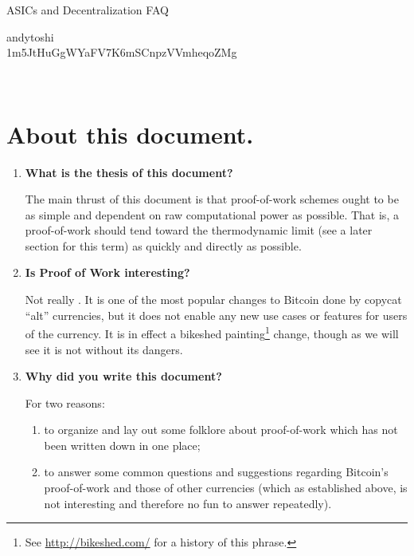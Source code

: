 \documentclass[letterpaper]{article}
\theoremstyle{xxx}
\theoremstyle{evil}
\theoremstyle{yyy}
\theoremstyle{plain}
\theoremstyle{zzz}
\begin{document}
\begin{minipage}[b]{0.7\linewidth}
{\huge ASICs and Decentralization FAQ}
\end{minipage}
\begin{minipage}[b]{0.3\linewidth}
  \begin{flushright}
    andytoshi{\tiny \\
    \tiny 1m5JtHuGgWYaFV7K6mSCnpzVVmheqoZMg}
  \end{flushright}
\end{minipage}
\\

\section{About this document.}
\begin{enumerate}
\item \textbf{What is the thesis of this document?}

The main thrust of this document is that proof-of-work schemes ought
to be as simple and dependent on raw computational power as possible.
That is, a proof-of-work should tend toward the thermodynamic limit
(see a later section for this term) as quickly and directly as possible.

\item \textbf{Is Proof of Work interesting?}

Not really \smiley. It is one of the most popular changes to Bitcoin done
by copycat ``alt'' currencies, but it does not enable any new use cases
or features for users of the currency. It is in effect a bikeshed
painting\footnote{See \url{http://bikeshed.com/} for a history of this
phrase.} change, though as we will see it is not without its dangers.

\item \textbf{Why did you write this document?}

For two reasons:
\begin{enumerate}
\item to organize and lay out some folklore about proof-of-work which has
not been written down in one place;
\item to answer some common questions and suggestions regarding Bitcoin's
proof-of-work and those of other currencies (which as established above,
is not interesting and therefore no fun to answer repeatedly).
\end{enumerate}

\end{enumerate}
\end{document}
